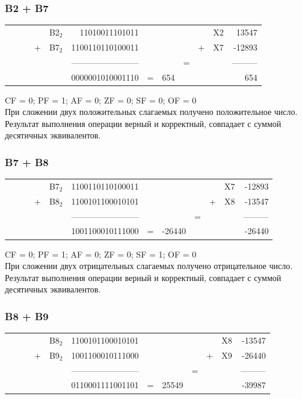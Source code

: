 \documentclass[11pt]{article}
\begin{document}
\subsubsection{B2 + B7}
\label{sec:org4d01f90}
\setlength{\tabcolsep}{3pt}
\label{tab:orgdede01d}
\begin{tabular}{lllllrlllllr}
 &  &  &  & B2\(_{\text{2}}\) & 11010011101011 &  &  &  &  & X2 & 13547\\
 &  &  & + & B7\(_{\text{2}}\) & 1100110110100011 &  &  &  & + & X7 & -12893\\
 &  &  &  &  & ------------------------ &  &  & = &  &  & ---------\\
 &  &  &  &  & 0000001010001110 & = & 654 &  &  &  & 654\\
\end{tabular}

CF = 0; PF = 1; AF = 0; ZF = 0; SF = 0; OF = 0\\
При сложении двух положительных слагаемых получено положительное число. Результат выполнения операции верный и корректный, совпадает с суммой десятичных эквивалентов.

\subsubsection{B7 + B8}
\label{sec:orga834b8e}
\setlength{\tabcolsep}{3pt}
\label{tab:org55b6420}
\begin{tabular}{lllllrlllllr}
 &  &  &  & B7\(_{\text{2}}\) & 1100110110100011 &  &  &  &  & X7 & -12893\\
 &  &  & + & B8\(_{\text{2}}\) & 1100101100010101 &  &  &  & + & X8 & -13547\\
 &  &  &  &  & ------------------------ &  &  & = &  &  & ---------\\
 &  &  &  &  & 1001100010111000 & = & -26440 &  &  &  & -26440\\
\end{tabular}

CF = 0; PF = 1; AF = 0; ZF = 0; SF = 1; OF = 0\\
При сложении двух отрицательных слагаемых получено отрицательное число. Результат выполнения операции верный и корректный, совпадает с суммой десятичных эквивалентов.

\subsubsection{B8 + B9}
\label{sec:orgfd79346}
\setlength{\tabcolsep}{3pt}
\label{tab:org5059467}
\begin{tabular}{lllllrlllllr}
 &  &  &  & B8\(_{\text{2}}\) & 1100101100010101 &  &  &  &  & X8 & -13547\\
 &  &  & + & B9\(_{\text{2}}\) & 1001100010111000 &  &  &  & + & X9 & -26440\\
 &  &  &  &  & ------------------------ &  &  & = &  &  & ---------\\
 &  &  &  &  & 0110001111001101 & = & 25549 &  &  &  & -39987\\
\end{tabular}
\end{document}
